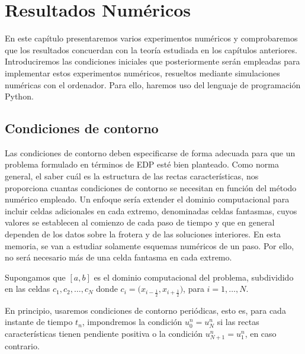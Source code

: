\chapter{Resultados Numéricos}\label{ch:results}

En este capítulo presentaremos varios experimentos numéricos y
comprobaremos que los resultados concuerdan con la teoría estudiada
en los capítulos anteriores.
Introduciremos las condiciones iniciales que posteriormente serán
empleadas para implementar estos experimentos numéricos, resueltos
mediante simulaciones numéricas con el ordenador.
Para ello, haremos uso del lenguaje de programación Python.

\section{Condiciones de contorno}

Las condiciones de contorno deben especificarse de forma adecuada
para que un problema formulado en términos de EDP esté bien planteado.
Como norma general, el saber cuál es la estructura de las rectas
características, nos proporciona cuantas condiciones de contorno se
necesitan en función del método numérico empleado.
Un enfoque sería extender el dominio computacional para incluir
celdas adicionales en cada extremo, denominadas celdas fantasmas,
cuyos valores se establecen al comienzo de cada paso de tiempo y que
en general dependen de los datos sobre la frotera y de las soluciones
interiores.
En esta memoria, se van a estudiar solamente esquemas numéricos de un
paso.
Por ello, no será necesario más de una celda fantasma en cada extremo.

Supongamos que $\left[a,b\right]$ es el dominio computacional del
problema, subdividido en las celdas $c_{1},c_{2},\dotsc,c_{N}$ donde
\begin{math}
	c_{i}=
	\big(
	x_{i-\frac{1}{2}},x_{i+\frac{1}{2}}
	\big)
\end{math},
para $i=1,\dotsc,N$.

En principio, usaremos condiciones de contorno periódicas, esto es,
para cada instante de tiempo $t_{n}$, impondremos la condición
$u^{n}_{0}=u^{n}_{N}$ si las rectas características tienen pendiente
positiva o la condición $u^{n}_{N+1}=u^{n}_{1}$, en caso contrario.


